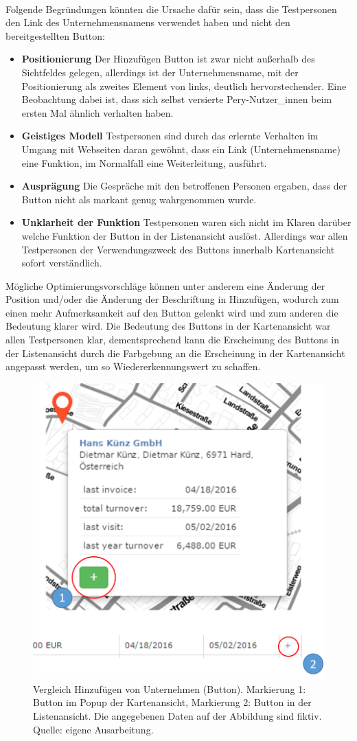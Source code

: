 \documentclass[Bachelorarbeit.tex]{subfiles}
\begin{document}
\\
Folgende Begründungen könnten die Ursache dafür sein, dass die Testpersonen den Link des Unternehmensnamens verwendet haben und nicht den bereitgestellten Button:
\begin{itemize}
	\item \textbf{Positionierung} Der Hinzufügen Button ist zwar nicht außerhalb des Sichtfeldes gelegen, allerdings ist der Unternehmensname, mit der Positionierung als zweites Element von links, deutlich hervorstechender. Eine Beobachtung dabei ist, dass sich selbst versierte Pery-Nutzer\_innen beim ersten Mal ähnlich verhalten haben.
	\item \textbf{Geistiges Modell} Testpersonen sind durch das erlernte Verhalten im Umgang mit Webseiten daran gewöhnt, dass ein Link (Unternehmensname) eine Funktion, im Normalfall eine Weiterleitung, ausführt.
	\item \textbf{Ausprägung} Die Gespräche mit den betroffenen Personen ergaben, dass der Button nicht als markant genug wahrgenommen wurde.
	\item \textbf{Unklarheit der Funktion} Testpersonen waren sich nicht im Klaren darüber welche Funktion der Button in der Listenansicht auslöst. Allerdings war allen Testpersonen der Verwendungszweck des Buttons innerhalb Kartenansicht sofort verständlich.
\end{itemize}
Mögliche Optimierungsvorschläge können unter anderem eine Änderung der Position und/oder die Änderung der Beschriftung in Hinzufügen, wodurch zum einen mehr Aufmerksamkeit auf den Button gelenkt wird und zum anderen die Bedeutung klarer wird. Die Bedeutung des Buttons in der Kartenansicht war allen Testpersonen klar, dementsprechend kann die Erscheinung des Buttons in der Listenansicht durch die Farbgebung an die Erscheinung in der Kartenansicht angepasst werden, um so Wiedererkennungswert zu schaffen.

\begin{figure}[h]
	\centering
	\includegraphics[width=0.7\linewidth]{img/Evaluation/Userfeedback/Add}
	\caption[Vergleich: Button Karte- und Listenansicht]{Vergleich Hinzufügen von Unternehmen (Button). Markierung 1: Button im Popup der Kartenansicht, Markierung 2: Button in der Listenansicht. Die angegebenen Daten auf der Abbildung sind fiktiv. Quelle: eigene Ausarbeitung.}
	\label{fig:Add}
\end{figure}
\end{document}
